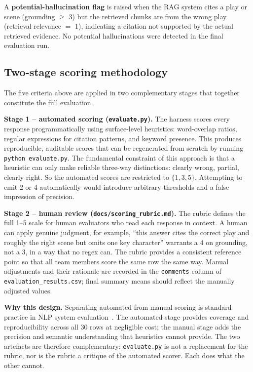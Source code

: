\documentclass[10pt,conference]{IEEEtran}
\begin{document}
A \textbf{potential-hallucination flag} is raised when the RAG system
cites a play or scene (grounding $\geq$ 3) but the retrieved chunks
are from the wrong play (retrieval relevance $=$ 1), indicating a
citation not supported by the actual retrieved evidence.
No potential hallucinations were detected in the final evaluation run.

\subsection{Two-stage scoring methodology}

The five criteria above are applied in two complementary stages that
together constitute the full evaluation.

\textbf{Stage 1 -- automated scoring (\texttt{evaluate.py}).}
The harness scores every response programmatically using surface-level
heuristics: word-overlap ratios, regular expressions for citation
patterns, and keyword presence. This produces reproducible, auditable
scores that can be regenerated from scratch by running
\texttt{python evaluate.py}. The fundamental constraint of this
approach is that a heuristic can only make reliable three-way
distinctions: clearly wrong, partial, clearly right. So the
automated scores are restricted to $\{1, 3, 5\}$. Attempting to emit
2 or 4 automatically would introduce arbitrary thresholds and a false
impression of precision.

\textbf{Stage 2 -- human review (\texttt{docs/scoring\_rubric.md}).}
The rubric defines the full 1--5 scale for human evaluators who read
each response in context. A human can apply genuine judgment, for
example, ``this answer cites the correct play and roughly the right
scene but omits one key character'' warrants a 4 on grounding, not a
3, in a way that no regex can. The rubric provides a consistent
reference point so that all team members score the same row the same
way. Manual adjustments and their rationale are recorded in the
\texttt{comments} column of \verb|evaluation_results.csv|; final
summary means should reflect the manually adjusted values.

\textbf{Why this design.} Separating automated from manual scoring is
standard practice in NLP system evaluation~\cite{lewis2020rag}. The
automated stage provides coverage and reproducibility across all 30
rows at negligible cost; the manual stage adds the precision and
semantic understanding that heuristics cannot provide. The two
artefacts are therefore complementary: \verb|evaluate.py| is not a
replacement for the rubric, nor is the rubric a critique of the
automated scorer. Each does what the other cannot.
\end{document}
